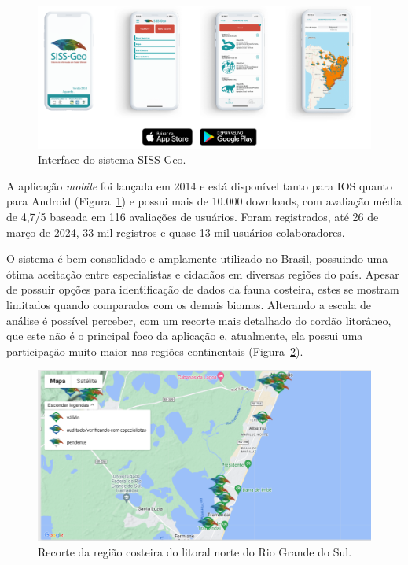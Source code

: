 \begin{figure}[htb]
  \centering
  \includegraphics[width=1\textwidth]{imagens/sisGeoApp.png}
  \caption{Interface do sistema SISS-Geo.}
  \label{fig:sisgeoApp}
\end{figure}

A aplicação \textit{mobile} foi lançada em 2014 e está disponível tanto para IOS quanto para Android (Figura~\ref{fig:sisgeoApp}) e possui mais de 10.000 downloads, com avaliação média de 4,7/5 baseada em 116 avaliações de usuários. Foram registrados, até 26 de março de 2024, 33 mil registros e quase 13 mil usuários colaboradores.

O sistema é bem consolidado e amplamente utilizado no Brasil, possuindo uma ótima aceitação entre especialistas e cidadãos em diversas regiões do país. Apesar de possuir opções para identificação de dados da fauna costeira, estes se mostram limitados quando comparados com os demais biomas. Alterando a escala de análise é possível perceber, com um recorte mais detalhado do cordão litorâneo, que este não é o principal foco da aplicação e, atualmente, ela possui uma participação muito maior nas regiões continentais (Figura~\ref{fig:sisgeoMap}).

\begin{figure}[htb]
  \centering
  \includegraphics[width=1\textwidth]{imagens/sisGeoMapa.png}
  \caption{Recorte da região costeira do litoral norte do Rio Grande do Sul.}
  \label{fig:sisgeoMap}
\end{figure}

